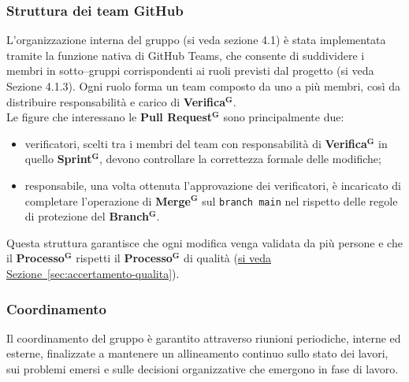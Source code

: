 \documentclass[a4paper,12pt]{article}
\newcommand{\term}[1]{\textbf{#1}$^\mathbf{G}$}
\begin{document}
\subsubsection{Struttura dei team GitHub} \label{sec:github-teams}
L’organizzazione interna del gruppo (si veda sezione 4.1) è stata implementata tramite la funzione nativa di GitHub Teams, che consente di suddividere i membri in sotto–gruppi corrispondenti ai ruoli previsti dal progetto (si veda Sezione 4.1.3). Ogni ruolo forma un team composto da uno a più membri, così da distribuire responsabilità e carico di \term{Verifica}.\\
Le figure che interessano le \term{Pull Request} sono principalmente due:
\begin{itemize}
    \item verificatori, scelti tra i membri del team con responsabilità di \term{Verifica} in quello \term{Sprint}, devono controllare la correttezza formale delle modifiche;
    \item responsabile, una volta ottenuta l’approvazione dei verificatori, è incaricato di completare l’operazione di \term{Merge} sul \texttt{branch main} nel rispetto delle regole di protezione del \term{Branch}.
\end{itemize}
Questa struttura garantisce che ogni modifica venga validata da più persone e che il \term{Processo} rispetti il \term{Processo} di qualità (\hyperref[sec:accertamento-qualita]{si veda Sezione~\ref*{sec:accertamento-qualita}}).

\subsubsection{Coordinamento}
Il coordinamento del gruppo è garantito attraverso riunioni periodiche, interne ed esterne, finalizzate a mantenere un allineamento continuo sullo stato dei lavori, sui problemi emersi e sulle decisioni organizzative che emergono in fase di lavoro.
\end{document}
